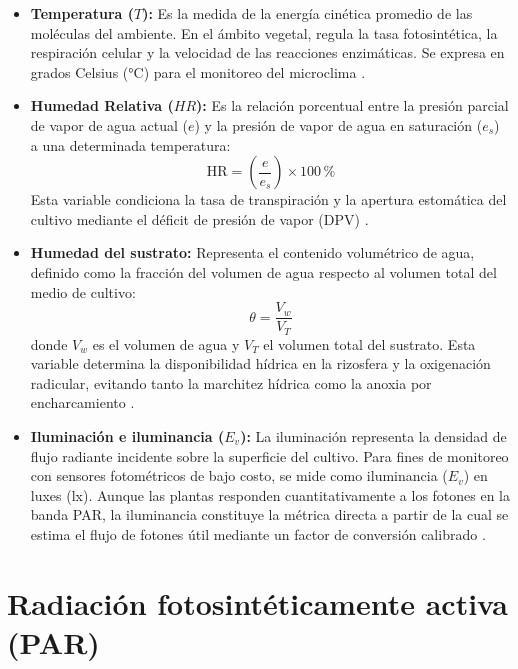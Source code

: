 \begin{itemize}
    \item \textbf{Temperatura ($T$):} Es la medida de la energía cinética promedio de las moléculas del ambiente. En el ámbito vegetal, regula la tasa fotosintética, la respiración celular y la velocidad de las reacciones enzimáticas. Se expresa en grados Celsius (\si{\celsius}) para el monitoreo del microclima \cite{ramos2015}.

    \item \textbf{Humedad Relativa ($HR$):} Es la relación porcentual entre la presión parcial de vapor de agua actual ($e$) y la presión de vapor de agua en saturación ($e_s$) a una determinada temperatura:
    \begin{equation}
        \text{HR} = \left( \frac{e}{e_s} \right) \times 100\,\text{\%}
        \label{eq:humedad_relativa}
    \end{equation}
    Esta variable condiciona la tasa de transpiración y la apertura estomática del cultivo mediante el déficit de presión de vapor (DPV) \cite{allen1998}.

    \item \textbf{Humedad del sustrato:} Representa el contenido volumétrico de agua, definido como la fracción del volumen de agua respecto al volumen total del medio de cultivo:
    \begin{equation}
        \theta = \frac{V_w}{V_T}
        \label{eq:vwc}
    \end{equation}
    donde $V_w$ es el volumen de agua y $V_T$ el volumen total del sustrato. Esta variable determina la disponibilidad hídrica en la rizosfera y la oxigenación radicular, evitando tanto la marchitez hídrica como la anoxia por encharcamiento \cite{savvas2018application}.

    \item \textbf{Iluminación e iluminancia ($E_v$):} La iluminación representa la densidad de flujo radiante incidente sobre la superficie del cultivo. Para fines de monitoreo con sensores fotométricos de bajo costo, se mide como iluminancia ($E_v$) en luxes (\si{\lux}). Aunque las plantas responden cuantitativamente a los fotones en la banda PAR, la iluminancia constituye la métrica directa a partir de la cual se estima el flujo de fotones útil mediante un factor de conversión calibrado \cite{deocampo2017, najera2023}.
\end{itemize}

\section{Radiación fotosintéticamente activa (PAR)}
\label{sec:par}

